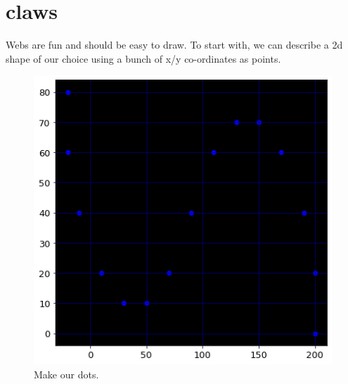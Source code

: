 \chapter{claws}
\label{sec:claws}
\lhead[tempest 2000]{}
\lstset{style=68KStyle}

Webs are fun and should be easy to draw. To start with, we can describe a 2d shape
of our choice using a bunch of x/y co-ordinates as points.
\begin{figure}[H]
    \centering
    \begin{adjustbox}{width=7cm,center}
      \includegraphics[width=12cm]{src/webs/sine_wave_dots_no_title.png}%
    \end{adjustbox}
  \caption{Make our dots.}
\end{figure}

